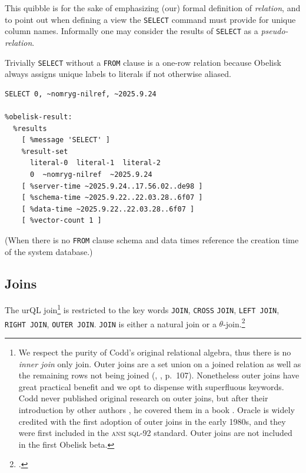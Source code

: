 \documentclass[twoside]{article}
\begin{document}
\noindent
This quibble is for the sake of emphasizing (our) formal definition of \emph{relation}, and to point out when defining a view the \lstinline[style=inlinecode]{SELECT} command must provide for unique column names. Informally one may consider the results of \lstinline[style=inlinecode]{SELECT} as a \emph{pseudo-relation}. 

Trivially \lstinline[style=inlinecode]{SELECT} without a \lstinline[style=inlinecode]{FROM} clause is a one-row relation because Obelisk always assigns unique labels to literals if not otherwise aliased.

\begin{lstlisting}[style=listingcode_sql]
SELECT 0, ~nomryg-nilref, ~2025.9.24

%obelisk-result:
  %results
    [ %message 'SELECT' ]
    %result-set
      literal-0  literal-1  literal-2
      0  ~nomryg-nilref  ~2025.9.24
    [ %server-time ~2025.9.24..17.56.02..de98 ]
    [ %schema-time ~2025.9.22..22.03.28..6f07 ]
    [ %data-time ~2025.9.22..22.03.28..6f07 ]
    [ %vector-count 1 ]
\end{lstlisting}

\noindent
(When there is no \lstinline[style=inlinecode]{FROM} clause schema and data times reference the creation time of the system database.)

\subsection{Joins}

The urQL join\footnote{We respect the purity of Codd's original relational algebra, thus there is no \emph{inner join} only join. Outer joins are a set union on a joined relation as well as the remaining rows not being joined (\citeauthor{Codd1990}, \citeyear{Codd1990}, p.~107). Nonetheless outer joins have great practical benefit and we opt to dispense with superfluous keywords. Codd never published original research on outer joins, but after their introduction by other authors \citep{Chamberlin1974}, he covered them in a book \citep{Codd1990}. Oracle is widely credited with the first adoption of outer joins in the early 1980s, and they were first included in the \textsc{ansi} \textsc{sql}-92 standard. Outer joins are not included in the first Obelisk beta.} is restricted to the key words \lstinline[style=inlinecode]{JOIN}, \lstinline[style=inlinecode]{CROSS} \lstinline[style=inlinecode]{JOIN}, \lstinline[style=inlinecode]{LEFT JOIN}, \lstinline[style=inlinecode]{RIGHT JOIN}, \lstinline[style=inlinecode]{OUTER JOIN}.  \lstinline[style=inlinecode]{JOIN} is either a natural join or a $\theta$-join.\footnote{\citet{Codd1970}.}
\end{document}
